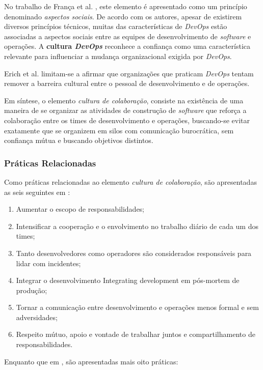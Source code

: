No trabalho de França et al. \cite{characterizing_devops}, este elemento é
apresentado como um princípio denominado \emph{aspectos sociais}. De acordo com os
autores, apesar de existirem diversos princípios técnicos, muitas das
características de \textit{DevOps} estão associadas a aspectos sociais entre as
equipes de desenvolvimento de \textit{software} e operações. A \textbf{cultura
\textit{DevOps}} reconhece a confiança como uma característica relevante para
influenciar a mudança organizacional exigida por \textit{DevOps}.

Erich et al. \cite{qualitative_devops_journalsw_17} limitam-se a afirmar que
organizações que praticam \textit{DevOps} tentam remover a barreira cultural
entre o pessoal de desenvolvimento e de operações.

Em síntese, o elemento \emph{cultura de colaboração}, consiste na existência de
 uma maneira de se organizar as atividades de construção
de \textit{software} que reforça a colaboração entre os times de desenvolvimento
e operações, buscando-se evitar exatamente que se organizem em silos com
comunicação burocrática, sem confiança mútua e buscando objetivos distintos.

\subsubsection{Práticas Relacionadas}

Como práticas relacionadas ao elemento \emph{cultura de colaboração}, são
apresentadas as seis seguintes em \cite{extending_dimensions}:

\begin{enumerate}
\item Aumentar o escopo de responsabilidades;
\item Intensificar a cooperação e o envolvimento no trabalho diário de cada um
dos times;
\item Tanto desenvolvedores como operadores são considerados responsáveis para
lidar com incidentes;
\item Integrar o desenvolvimento Integrating development em pós-mortem de
produção;
\item Tornar a comunicação entre desenvolvimento e operações menos formal e
sem adversidades;
\item Respeito mútuo, apoio e vontade de trabalhar juntos e compartilhamento
de responsabilidades.
\end{enumerate}

Enquanto que em \cite{characterizing_devops}, são apresentadas mais oito
práticas:

